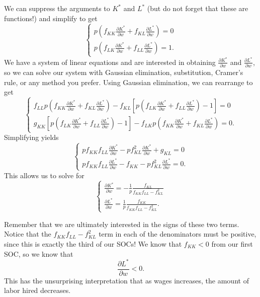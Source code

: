 We can suppress the arguments to $K^*$ and $L^*$ (but do not forget that these are functions!) and simplify to get 
$$\begin{cases}
p\left(f_{K K} \frac{\partial K^{*}}{\partial w}+f_{K L} \frac{\partial L^{*}}{\partial w}\right)=0 \\
p\left(f_{L K} \frac{\partial K^{*}}{\partial w}+f_{L L} \frac{\partial L^{*}}{\partial w}\right)=1.
\end{cases}$$
We have a system of linear equations and are interested in obtaining $\frac{\partial K^*}{\partial w}$ and $\frac{\partial L^*}{\partial w}$, so we can solve our system with Gaussian elimination, substitution, Cramer's rule, or any method you prefer. Using Gaussian elimination, we can rearrange to get 
$$\begin{cases}
f_{L L} p\left(f_{K K} \frac{\partial K^{*}}{\partial w}+f_{K L} \frac{\partial L^{*}}{\partial w}\right)-f_{K L}\left[p\left(f_{L K} \frac{\partial K^{*}}{\partial w}+f_{L L} \frac{\partial L^{*}}{\partial w}\right)-1\right]=0 \\
g_{K K}\left[p\left(f_{L K} \frac{\partial K^{*}}{\partial w}+f_{L L} \frac{\partial L^{*}}{\partial w}\right)-1\right]-f_{L K} p\left(f_{K K} \frac{\partial K^{*}}{\partial w}+f_{K L} \frac{\partial L^{*}}{\partial w}\right)=0.
\end{cases}$$
Simplifying yields 
$$\begin{cases}
p f_{K K} f_{L L} \frac{\partial K^{*}}{\partial w}-p f_{K L}^{2} \frac{\partial K^{*}}{\partial w}+g_{K L}=0 \\
p f_{K K} f_{L L} \frac{\partial L^{*}}{\partial w}-f_{K K}-p f_{K L}^{2} \frac{\partial L^{*}}{\partial w}=0.
\end{cases}$$
This allows us to solve for 
$$\boxed{\begin{cases}
\frac{\partial K^{*}}{\partial w}=-\frac{1}{p} \frac{f_{K L}}{f_{K K} f_{L L}-f_{K L}^{2}} \\
\frac{\partial L^{*}}{\partial w}=\frac{1}{p} \frac{f_{K K}}{f_{K K} f_{L L}-f_{K L}^{2}}.
\end{cases}}$$

Remember that we are ultimately interested in the signs of these two terms. Notice that the $f_{K K} f_{L L}-f_{K L}^{2}$ term in each of the denominators must be positive, since this is exactly the third of our SOCs! We know that $f_{KK} < 0$ from our first SOC, so we know that 
$$\frac{\partial L^{*}}{\partial w} < 0.$$
This has the unsurprising interpretation that as wages increases, the amount of labor hired decreases. 

